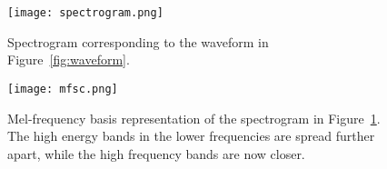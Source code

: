 \begin{figure}
\centering
\texttt{[image: spectrogram.png]}
\caption{Spectrogram corresponding to the waveform in Figure~\ref{fig:waveform}.}
\label{fig:spectrogram}
\end{figure}





\begin{figure}
\centering
\texttt{[image: mfsc.png]}
\caption{Mel-frequency basis representation of the spectrogram in Figure~\ref{fig:spectrogram}. The high energy bands in the lower frequencies are spread further apart, while the high frequency bands are now closer.}
\label{fig:mfsc}
\end{figure}















